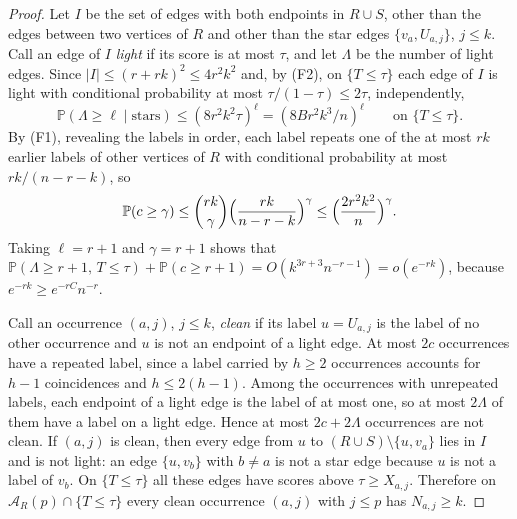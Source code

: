\documentclass[11pt]{amsart}
\theoremstyle{remark}
\numberwithin{equation}{section}
\newcommand{\Pp}{\mathbb P}
\newcommand{\1}{\mathbf 1}
\begin{document}
\begin{proof}
Let $I$ be the set of edges with both endpoints in $R\cup S$, other than the edges between two vertices of $R$ and other than the star edges $\{v_a,U_{a,j}\}$, $j\le k$. Call an edge of $I$ \emph{light} if its score is at most $\tau$, and let $\Lambda$ be the number of light edges. Since $|I|\le(r+rk)^2\le4r^2k^2$ and, by (F2), on $\{T\le\tau\}$ each edge of $I$ is light with conditional probability at most $\tau/(1-\tau)\le2\tau$, independently,
\begin{equation}\label{eq:light}
\Pp(\Lambda\ge\ell\mid\text{stars})\le(8r^2k^2\tau)^\ell=(8Br^2k^3/n)^\ell\qquad\text{on }\{T\le\tau\}.
\end{equation}
By (F1), revealing the labels in order, each label repeats one of the at most $rk$ earlier labels of other vertices of $R$ with conditional probability at most $rk/(n-r-k)$, so
\begin{equation}\label{eq:coll}
\Pp(c\ge\gamma)\le\binom{rk}\gamma\Bigl(\frac{rk}{n-r-k}\Bigr)^\gamma\le\Bigl(\frac{2r^2k^2}n\Bigr)^\gamma .
\end{equation}
Taking $\ell=r+1$ and $\gamma=r+1$ shows that $\Pp(\Lambda\ge r+1,\,T\le\tau)+\Pp(c\ge r+1)=O(k^{3r+3}n^{-r-1})=o(e^{-rk})$, because $e^{-rk}\ge e^{-rC}n^{-r}$.

Call an occurrence $(a,j)$, $j\le k$, \emph{clean} if its label $u=U_{a,j}$ is the label of no other occurrence and $u$ is not an endpoint of a light edge. At most $2c$ occurrences have a repeated label, since a label carried by $h\ge2$ occurrences accounts for $h-1$ coincidences and $h\le2(h-1)$. Among the occurrences with unrepeated labels, each endpoint of a light edge is the label of at most one, so at most $2\Lambda$ of them have a label on a light edge. Hence at most $2c+2\Lambda$ occurrences are not clean. If $(a,j)$ is clean, then every edge from $u$ to $(R\cup S)\setminus\{u,v_a\}$ lies in $I$ and is not light: an edge $\{u,v_b\}$ with $b\ne a$ is not a star edge because $u$ is not a label of $v_b$. On $\{T\le\tau\}$ all these edges have scores above $\tau\ge X_{a,j}$. Therefore on $\mathcal A_R(p)\cap\{T\le\tau\}$ every clean occurrence $(a,j)$ with $j\le p$ has $N_{a,j}\ge k$.


\end{proof}
\end{document}
